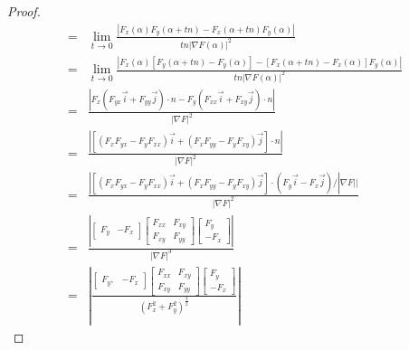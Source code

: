 \documentclass[12pt,a4paper]{article}
\begin{document}
\begin{proof}
\begin{align*}
	      = &\lim_{t\rightarrow 0}\frac{|F_x(\alpha)F_y(\alpha + tn) - F_x(\alpha + tn)F_y(\alpha)|}{tn|\nabla F(\alpha)|^2}\\
	      = &\lim_{t\rightarrow 0}\frac{|F_x(\alpha)[F_y(\alpha + tn) - F_y(\alpha)] - [F_x(\alpha + tn) - F_x(\alpha)]F_y(\alpha)|}{tn|\nabla F(\alpha)|^2}\\
	      = &\frac{|F_x(F_{yx}\vec i + F_{yy}\vec j)\cdot n - F_y(F_{xx}\vec i + F_{xy}\vec j)\cdot n|}{|\nabla F|^2}\\
	      = &\frac{|[(F_xF_{yx} - F_yF_{xx})\vec i + (F_xF_{yy} - F_yF_{xy})\vec j]\cdot n|}{|\nabla F|^2}\\
	      = &\frac{|[(F_xF_{yx} - F_yF_{xx})\vec i + (F_xF_{yy} - F_yF_{xy})\vec j]\cdot (F_y\vec i - F_x\vec j)/|\nabla F||}{|\nabla F|^2}\\
	      = &
	      \frac{
		      \left|
		      \left[
			      \begin{array}{cc} F_y & -F_x\end{array}
		      \right]
			      \left[
			      \begin{array}{cc} F_{xx} & F_{xy} \\ F_{xy} & F_{yy} \end{array}
		      \right]
			      \left[
			      \begin{array}{c} F_y \\ -F_x\end{array}
		      \right]
		      \right|
	      }
		{
			|\nabla F|^3
		}\\
		= &
		\left|
		\frac{
			\left[
				\begin{array}{cc} F_y, & -F_x\end{array}
			\right]
				\left[
				\begin{array}{cc} F_{xx} & F_{xy} \\ F_{xy} & F_{yy} \end{array}
			\right]
				\left[
				\begin{array}{c} F_y \\ -F_x\end{array}
			\right]
		}{(F_x^2+F_y^2)^\frac32}
		\right|
\end{align*}
\end{proof}
\end{document}
